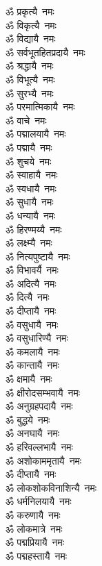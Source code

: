 \begin{multicols}{2}
\begin{flushleft}
ॐ प्रकृत्यै~नमः\\
ॐ विकृत्यै~नमः\\
ॐ विद्यायै~नमः\\
ॐ सर्वभूतहितप्रदायै~नमः\\
ॐ श्रद्धायै~नमः\\
ॐ विभूत्यै~नमः\\
ॐ सुरभ्यै~नमः\\
ॐ परमात्मिकायै~नमः\\
ॐ वाचे~नमः\\
ॐ पद्मालयायै~नमः\hfill{}\\
ॐ पद्मायै~नमः\\
ॐ शुचये~नमः\\
ॐ स्वाहायै~नमः\\
ॐ स्वधायै~नमः\\
ॐ सुधायै~नमः\\
ॐ धन्यायै~नमः\\
ॐ हिरण्मय्यै~नमः\\
ॐ लक्ष्म्यै~नमः\\
ॐ नित्यपुष्टायै~नमः\\
ॐ विभावर्यै~नमः\hfill{}\\
ॐ अदित्यै~नमः\\
ॐ दित्यै~नमः\\
ॐ दीप्तायै~नमः\\
ॐ वसुधायै~नमः\\
ॐ वसुधारिण्यै~नमः\\
ॐ कमलायै~नमः\\
ॐ कान्तायै~नमः\\
ॐ क्षमायै~नमः\\
ॐ क्षीरोदसम्भवायै~नमः\\
ॐ अनुग्रहपदायै~नमः\hfill{}\\
ॐ बुद्धये~नमः\\
ॐ अनघायै~नमः\\
ॐ हरिवल्लभायै~नमः\\
ॐ अशोकाममृतायै~नमः\\
ॐ दीप्तायै~नमः\\
ॐ लोकशोकविनाशिन्यै~नमः\\
ॐ धर्मनिलयायै~नमः\\
ॐ करुणायै~नमः\\
ॐ लोकमात्रे~नमः\\
ॐ पद्मप्रियायै~नमः\hfill{}\\
ॐ पद्महस्तायै~नमः\\

\end{flushleft}
\end{multicols}
